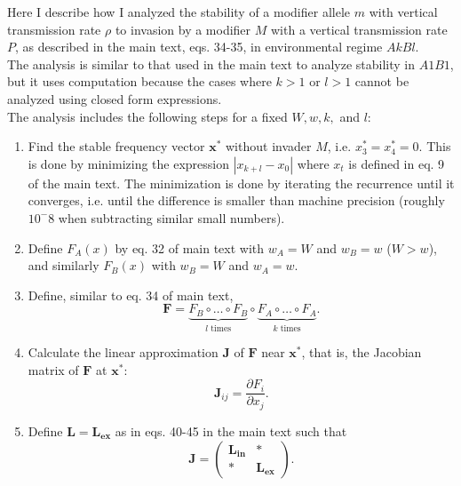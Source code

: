 \documentclass[11pt, oneside]{article}   	%
\let\vec\mathbf
\newcommand{\beginsupplement}{%
	\setcounter{table}{0}
	\renewcommand{\thetable}{A\arabic{table}}%
	\setcounter{figure}{0}
	\renewcommand{\thefigure}{A\arabic{figure}}%
	\setcounter{equation}{0}
	\renewcommand{\theequation}{A\arabic{equation}}%
}
\begin{document}
\beginsupplement

Here I describe how I analyzed the stability of a modifier allele $m$ with vertical transmission rate $\rho$ to invasion by a modifier $M$ with a vertical transmission rate $P$, as described in the main text, eqs. 34-35, in environmental regime $AkBl$.
\\
The analysis is similar to that used in the main text to analyze stability in $A1B1$, but it uses computation because the cases where $k>1$ or $l>1$ cannot be analyzed using closed form expressions.
\\
The analysis includes the following steps for a fixed $W, w, k,$ and $l$:
\begin{enumerate}

\item Find the stable frequency vector $\vec{x^*}$ without invader $M$, i.e. $x^*_3=x^*_4=0$. This is done by minimizing the expression $|x_{k+l} - x_{0}|$ where $x_{t}$ is defined in eq. 9 of the main text. The minimization is done by iterating the recurrence until it converges, i.e. until the difference is smaller than machine precision (roughly $10^-8$ when subtracting similar small numbers).

\item Define $F_A(x)$ by eq. 32 of main text with $w_A=W$ and $w_B=w$ ($W>w$), and similarly $F_B(x)$ with $w_B=W$ and $w_A=w$.

\item Define, similar to eq. 34 of main text,
\begin{equation}
\vec{F} = \underbrace{F_B \circ \ldots \circ F_B}_{l \text{ times}} \circ
	\underbrace{F_A \circ \ldots \circ F_A}_{k \text{ times}}.
\label{eq:F}\end{equation}

\item Calculate the linear approximation $\vec{J}$ of $\vec{F}$  near $\vec{x^*}$, that is, the Jacobian matrix of $\vec{F}$ at $\vec{x^*}$:
\begin{equation}
\vec{J}_{ij} = \frac{\partial F_i}{\partial x_j}.
\label{eq:jacobian}\end{equation}

\item Define $\vec{L}=\vec{L_{ex}}$ as in eqs. 40-45 in the main text such that
\begin{equation}
\vec{J} = \begin{pmatrix}
\vec{L_{in}} & * \\
* & \vec{L_{ex}}
\end{pmatrix}.
\end{equation}


\end{enumerate}
\end{document}
